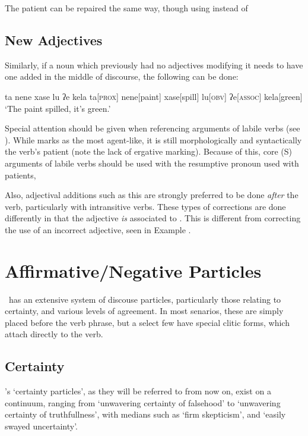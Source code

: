 The patient can be repaired the same way, though using  instead of 
\subsection{New Adjectives}
Similarly, if a noun which previously had no adjectives modifying it needs to have one added in the middle of discourse, the following can be done:

\ex
\begingl
\glpreamble ta nene xase lu ʔe kela
\endpreamble
ta[\textsc{prox}]
nene[paint]
xase[spill]
lu[\textsc{obv}]
ʔe[\textsc{assoc}]
kela[green]
\glft `The paint spilled, it's green.'
\endgl
\xe


Special attention should be given when referencing arguments of labile verbs (see ).
While  marks  as the most agent-like, it is still morphologically and syntactically the verb's patient (note the lack of ergative marking).
Because of this, core (S) arguments of labile verbs should be used with the resumptive pronoun used with patients, 

Also, adjectival additions such as this are strongly preferred to be done \textit{after} the verb, particularly with intransitive verbs.
These types of corrections are done differently in that the adjective \textit{is} associated to .
This is different from correcting the use of an incorrect adjective, seen in Example .

\section{Affirmative/Negative Particles}\label{sec:certainty}

\langname\ has an extensive system of discouse particles, particularly those relating to certainty, and various levels of agreement.
In most senarios, these are simply placed before the verb phrase, but a select few have special clitic forms, which attach directly to the verb.

\subsection{Certainty}

\langname 's `certainty particles', as they will be referred to from now on, exist on a continuum, ranging from  `unwavering certainty of falsehood' to  `unwavering certainty of truthfullness', with medians such as  `firm skepticism', and  `easily swayed uncertainty'.

